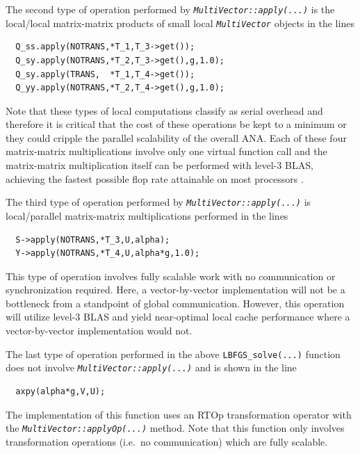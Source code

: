 The second type of operation performed by
{}\texttt{\textit{Multi\-Vector\-::apply(\-...)}} is the local/local
matrix-matrix products of small local
{}\texttt{\textit{Multi\-Vector}} objects in the lines

{\scriptsize\begin{verbatim}
  Q_ss.apply(NOTRANS,*T_1,T_3->get());
  Q_sy.apply(NOTRANS,*T_2,T_3->get(),g,1.0);
  Q_sy.apply(TRANS,  *T_1,T_4->get());
  Q_yy.apply(NOTRANS,*T_2,T_4->get(),g,1.0);
\end{verbatim}}

{}\noindent{}Note that these types of local computations classify as
serial overhead and therefore it is critical that the cost of these
operations be kept to a minimum or they could cripple the parallel
scalability of the overall ANA.  Each of these four matrix-matrix
multiplications involve only one virtual function call and the
matrix-matrix multiplication itself can be performed with level-3
BLAS, achieving the fastest possible flop rate attainable on most
processors {}\cite{ref:demmel_1997}.

The third type of operation performed by
{}\texttt{\textit{Multi\-Vector\-::apply(\-...)}} is local/parallel
matrix-matrix multiplications performed in the lines

{\scriptsize\begin{verbatim}
  S->apply(NOTRANS,*T_3,U,alpha);
  Y->apply(NOTRANS,*T_4,U,alpha*g,1.0);
\end{verbatim}}

{}\noindent{}This type of operation involves fully scalable work with
no communication or synchronization required.  Here, a
vector-by-vector implementation will not be a bottleneck from a
standpoint of global communication.  However, this operation will
utilize level-3 BLAS and yield near-optimal local cache performance
where a vector-by-vector implementation would not.

The last type of operation performed in the above
{}\texttt{LBFGS\_solve(...)}  function does not involve
{}\texttt{\textit{Multi\-Vector\-::apply(\-...)}} and is shown in the
line

{\scriptsize\begin{verbatim}
  axpy(alpha*g,V,U);
\end{verbatim}}

{}\noindent{}The implementation of this function uses an RTOp
transformation operator with the
{}\texttt{\textit{Multi\-Vector\-::applyOp(\-...)}}  method.  Note
that this function only involves transformation operations (i.e.~no
communication) which are fully scalable.

